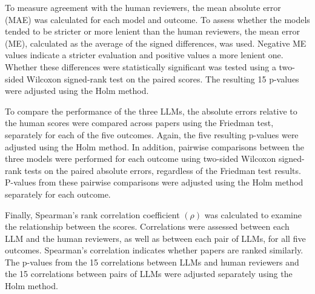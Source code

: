 To measure agreement with the human reviewers, the mean absolute error (MAE) was calculated for each model and outcome. To assess whether the models tended to be stricter or more lenient than the human reviewers, the mean error (ME), calculated as the average of the signed differences, was used. Negative ME values indicate a stricter evaluation and positive values a more lenient one. Whether these differences were statistically significant was tested using a two-sided Wilcoxon signed-rank test on the paired scores. The resulting 15 p-values were adjusted using the Holm method. 

To compare the performance of the three LLMs, the absolute errors relative to the human scores were compared across papers using the Friedman test, separately for each of the five outcomes. Again, the five resulting p-values were adjusted using the Holm method. In addition, pairwise comparisons between the three models were performed for each outcome using two-sided Wilcoxon signed-rank tests on the paired absolute errors, regardless of the Friedman test results. P-values from these pairwise comparisons were adjusted using the Holm method separately for each outcome.

Finally, Spearman’s rank correlation coefficient $(\rho)$ was calculated to examine the relationship between the scores. Correlations were assessed between each LLM and the human reviewers, as well as between each pair of LLMs, for all five outcomes. Spearman’s correlation indicates whether papers are ranked similarly. The p-values from the 15 correlations between LLMs and human reviewers and the 15 correlations between pairs of LLMs were adjusted separately using the Holm method. 


